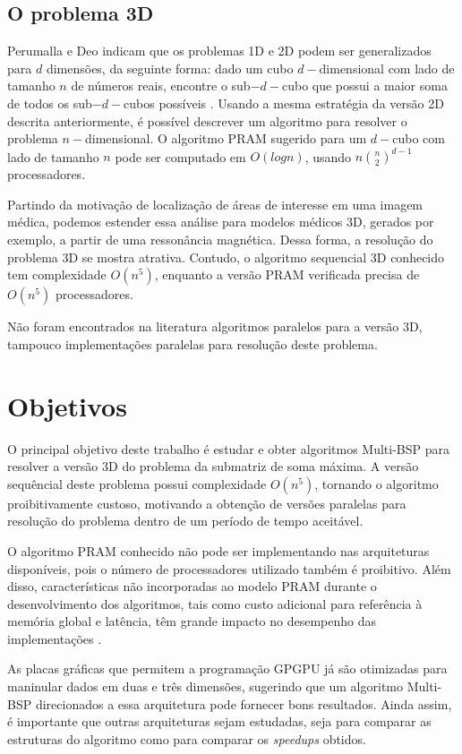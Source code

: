 \documentclass[a4paper, 12pt] {article}
\begin{document}
\subsection{O problema 3D}

Perumalla e Deo indicam que os problemas 1D e 2D
podem ser generalizados para $d$ dimensões, da seguinte forma: dado um cubo $d-$dimensional com lado de tamanho $n$ de números reais,
encontre o sub$-d-$cubo que possui a maior soma de todos os sub$-d-$cubos
possíveis \cite{journals/ppl/PerumallaD95}. Usando a mesma estratégia da versão
2D descrita anteriormente, é possível descrever um algoritmo para resolver o problema $n-$dimensional. O
algoritmo PRAM sugerido para um $d-$cubo com lado de tamanho $n$ pode ser
computado em $O(log n)$, usando $n\binom{n}{2}^{d-1}$ processadores.

Partindo da motivação de localização de áreas de interesse em uma imagem médica,
podemos estender essa análise para modelos médicos 3D, gerados por exemplo, a
partir de uma ressonância magnética. Dessa forma, a resolução do problema 3D se
mostra atrativa. Contudo, o algoritmo sequencial 3D conhecido tem complexidade
$O(n^5)$, enquanto a versão PRAM verificada precisa de $O(n^5)$ processadores.

Não foram encontrados na literatura algoritmos paralelos para a versão
3D, tampouco implementações paralelas para resolução deste problema.


\section{Objetivos}

O principal objetivo deste trabalho é estudar e obter algoritmos Multi-BSP
para resolver a versão 3D do problema da submatriz de soma máxima. A versão sequêncial deste
problema possui complexidade $O(n^5)$, tornando o algoritmo proibitivamente
custoso, motivando a obtenção de versões paralelas para resolução do problema
dentro de um período de tempo aceitável.

O algoritmo PRAM conhecido não pode ser implementando nas arquiteturas
disponíveis, pois o número de processadores utilizado também é proibitivo. Além
disso, características não incorporadas ao modelo PRAM durante o
desenvolvimento dos algoritmos, tais como custo adicional para referência à memória global e latência, 
têm grande impacto no desempenho das implementações \cite{castro2003}.

As placas gráficas que permitem a programação GPGPU já são otimizadas para
maninular dados em duas e três dimensões, sugerindo que um algoritmo Multi-BSP
direcionados a essa arquitetura pode fornecer bons resultados. Ainda assim, é
importante que outras arquiteturas sejam estudadas, seja para comparar as
estruturas do algoritmo como para comparar os \textit{speedups} obtidos.
\end{document}
